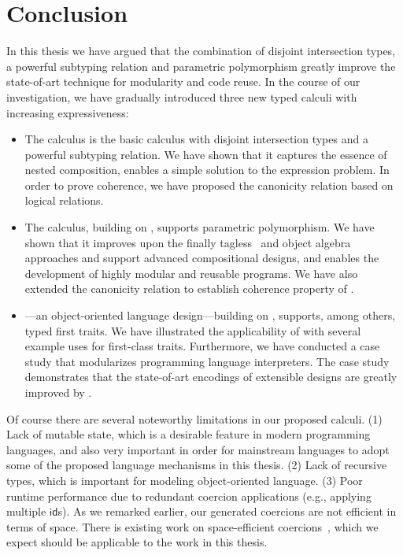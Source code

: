 \chapter{Conclusion}
\label{chap:conclusion}


In this thesis we have argued that the combination of disjoint intersection
types, a powerful subtyping relation and parametric polymorphism greatly improve
the state-of-art technique for modularity and code reuse. In the course of our
investigation, we have gradually introduced three new typed calculi with
increasing expressiveness:
\begin{itemize}
\item The \namee calculus is the basic calculus with disjoint intersection types
  and a powerful subtyping relation. We have shown that it captures the essence
  of nested composition, enables a simple solution to the expression problem. In
  order to prove coherence, we have proposed the canonicity relation based on
  logical relations.
\item The \fnamee calculus, building on \namee, supports parametric
  polymorphism. We have shown that it improves upon the finally
  tagless~\citep{CARETTE_2009} and object
  algebra~\citep{oliveira2012extensibility} approaches and support advanced
  compositional designs, and enables the development of highly modular and
  reusable programs. We have also extended the canonicity relation to establish
  coherence property of \fnamee.
\item \sedel---an object-oriented language design---building on \fnamee,
  supports, among others, typed first traits. We have illustrated the
  applicability of \sedel with several example uses for first-class traits.
  Furthermore, we have conducted a case study that modularizes programming
  language interpreters. The case study demonstrates that the state-of-art
  encodings of extensible designs are greatly improved by \sedel.
\end{itemize}


Of course there are several noteworthy limitations in our proposed calculi. (1)
Lack of mutable state, which is a desirable feature in modern programming
languages, and also very important in order for mainstream languages to adopt
some of the proposed language mechanisms in this thesis. (2) Lack of recursive
types, which is important for modeling object-oriented language. (3) Poor
runtime performance due to redundant coercion applications (e.g., applying multiple
$\mathsf{id}$s). As we remarked earlier, our generated coercions are not
efficient in terms of space. There is existing work on space-efficient
coercions~\citep{Siek_2015, herman2010space}, which we expect should be
applicable to the work in this thesis.


